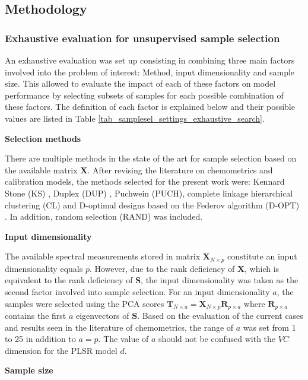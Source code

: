\documentclass[journal=ancham,manuscript=article]{achemso}
\begin{document}
\subsection{Methodology}\label{methodology}

\subsubsection{Exhaustive evaluation for unsupervised sample selection}

An exhaustive evaluation was set up consisting in combining three main factors involved into the problem of interest: Method, input dimensionality and sample size. This allowed to evaluate the impact of each of these factors on model performance by selecting subsets of samples for each possible combination of these factors. The definition of each factor is explained below and their possible values are listed in Table \ref{tab_samplesel_settings_exhaustive_search}.

\textbf{Selection methods}

There are multiple methods in the state of the art for sample selection based on the available matrix $\mathbf{X}$. After revising the literature on chemometrics and calibration models, the methods selected for the present work were: Kennard Stone (KS) \cite{Kennard1969}, Duplex (DUP) \cite{Snee1977}, Puchwein (PUCH)\cite{Puchwein1988}, complete linkage hierarchical clustering (CL) \cite{Naes1990} and D-optimal designs based on the Federov algorithm (D-OPT) \cite{Goos2011}. In addition, random selection (RAND) was included. 

\textbf{Input dimensionality}

The available spectral measurements stored in matrix $\mathbf{X}_{N\times p}$ constitute an input dimensionality equals $p$. However, due to the rank deficiency of $\mathbf{X}$, which is equivalent to the rank deficiency of $\mathbf{S}$, the input dimensionality was taken as the second factor involved into sample selection. For an input dimensionality $a$, the samples were selected using the PCA scores $\mathbf{T}_{N\times a} = \mathbf{X}_{N\times p}\mathbf{R}_{p\times a}$ where $\mathbf{R}_{p\times a}$ contains the first $a$ eigenvectors of $\mathbf{S}$. Based on the evaluation of the current cases and results seen in the literature of chemometrics, the range of $a$ was set from 1 to 25 in addition to $a=p$. The value of $a$ should not be confused with the $VC$ dimension for the PLSR model $d$. 

\textbf{Sample size}
\end{document}
